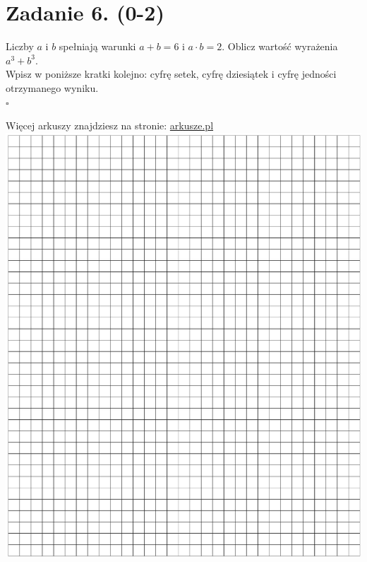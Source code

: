 \documentclass[10pt]{article}
\begin{document}
\section*{Zadanie 6. (0-2)}
Liczby \(a\) i \(b\) spełniają warunki \(a+b=6\) i \(a \cdot b=2\). Oblicz wartość wyrażenia \(a^{3}+b^{3}\).\\
Wpisz w poniższe kratki kolejno: cyfrę setek, cyfrę dziesiątek i cyfrę jedności otrzymanego wyniku.\\
\(\square\)

Więcej arkuszy znajdziesz na stronie: \href{http://arkusze.pl}{arkusze.pl}\\
\includegraphics[max width=\textwidth, center]{2024_11_21_5229b9d0453456f1828dg-04}
\end{document}
